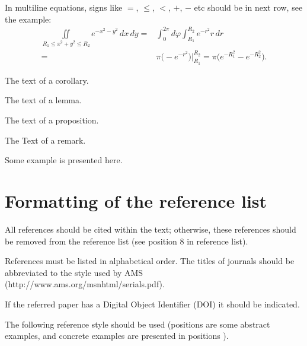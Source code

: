 \documentclass[12pt,twoside,draft]{cmpart}
\begin{document}
In multiline equations, signs like 
$=$, $\le$, $<$, $+$, $-$ etc should be in next row, see the example:
\[
\begin{split}
\iint\limits_{R_1\le x^2+y^2\le R_2} e^{-x^2-y^2}\,dx\,dy
=&\int_0^{2\pi} d\varphi\int_{R_1}^{R_2} e^{-r^2} r\,dr\\
=&\pi\big(-e^{-r^2}\big)\big\vert_{R_1}^{R_2}=\pi\big(e^{-R_1^2}-e^{-R_2^2}\big).
\end{split}
\]

\begin{corollary}
The text of a corollary.
\end{corollary}

\begin{lemma}
The text of a lemma.
\end{lemma}

\begin{proposition}
The text of a proposition.
\end{proposition}

\begin{remark}
The Text of a remark.
\end{remark}

\begin{example}
Some example is presented here.
\end{example}

\section{Formatting of the reference list}

All references should be cited within the text;
otherwise, these references should be removed from the reference list
(see position 8 in reference list).

References must be listed in alphabetical order.
The titles of journals should be abbreviated to the style used by AMS
(http://www.ams.org/msnhtml/serials.pdf).

If the referred paper has a Digital Object Identifier (DOI)
it should be indicated.

The following reference style should be used
(positions \cite{k1,k2,k3,k4,k5,k6,k7} are some abstract examples,
and concrete examples are presented in positions \cite{ke1,ke2,ke3,ke4,ke5,ke6,ke7}).
\end{document}
